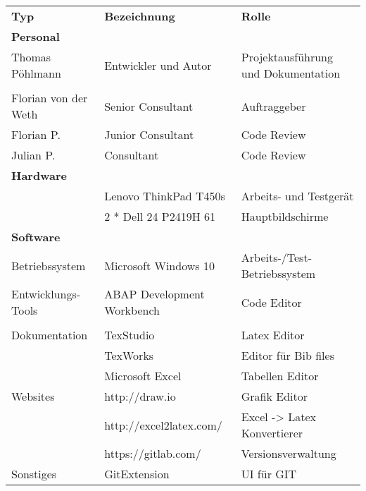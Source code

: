 \begin{tabu}{p{0.31\textwidth}p{0.31\textwidth}p{0.31\textwidth}}
\rowfont{\bfseries\leavevmode\color{headingfont}}\textbf{Typ} & \textbf{Bezeichnung} & \textbf{Rolle} \\
\textbf{Personal} & & \\\hline
Thomas Pöhlmann & Entwickler und Autor & Projektausführung und Dokumentation \\\\[-1em]\hline
Florian von der Weth & Senior Consultant & Auftraggeber \\\hline
Florian P. & Junior Consultant & Code Review \\\hline
Julian P. & Consultant & Code Review\\\hline
{}\textbf{Hardware} & & \\\hline
 & Lenovo ThinkPad T450s & Arbeits- und Testgerät \\\hline
 & 2 * Dell 24 P2419H 61 & Hauptbildschirme \\\hline
{}\textbf{Software} & & \\\hline
Betriebssystem & Microsoft Windows 10 & Arbeits-/Test-Betriebssystem \\\hline
Entwicklungs-Tools & ABAP Development Workbench & Code Editor \\\\[-1em]\hline
Dokumentation & TexStudio & Latex Editor \\\hline
 & TexWorks & Editor für Bib files \\\hline
 & Microsoft Excel & Tabellen Editor \\\hline
Websites & http://draw.io & Grafik Editor \\\hline
 & http://excel2latex.com/ & Excel -> Latex Konvertierer \\\hline
 & https://gitlab.com/ & Versionsverwaltung \\\hline
Sonstiges & GitExtension & UI für GIT \\\hline 
\end{tabu}